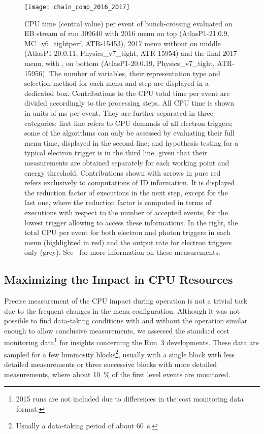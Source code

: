 \begin{figure}[ht]
\centering
\texttt{[image: chain\_comp\_2016\_2017]}%
\caption{%
\label{fig:chain_cpu_comp_2016_2017}%
\hlt CPU time (central value) per event of bunch-crossing evaluated on EB stream
of run 309640 with 2016 menu on top (AtlasP1-21.0.9, MC\_v6\_tightperf,
ATR-15453), 2017 menu without \rnn on middle (AtlasP1-20.0.11,
Physics\_v7\_tight, ATR-15954) and the final 2017 menu, with \rnn, on bottom
(AtlasP1-20.0.19, Physics\_v7\_tight, ATR-15956). The number of
variables, their representation type and selection method for each menu and step
are displayed in a dedicated box. Contributions to the CPU total time per event
are divided accordingly to the processing steps. All CPU time is shown in units
of ms per event. They are further separated in three categories: first line
refers to CPU demands of all electron triggers; some of the \fastelectron
algorithms can only be assessed by evaluating their full menu time, displayed in
the second line; and hypothesis testing for a typical electron trigger is in the
third line, given that their measurements are obtained separately for each
working point and energy threshold. Contributions shown with arrows in pure red
refers exclusively to computations of ID information. It is displayed the
reduction factor of executions in the next step, except for the last one, where
the reduction factor is computed in terms of executions with respect to the
number of accepted events, for the lowest \et{} \tight{} trigger allowing to
access these informations. In the right, the total CPU per event for both
electron and photon triggers in each menu (highlighted in red) and the \hlt
output rate for electron triggers only (grey).  See~\cite{ATR-15957} for more
information on these measurements.}
\end{figure}

\FloatBarrier
\subsection{Maximizing the Impact in CPU Resources}\label{ssec:menu_cpu}

Precise measurement of the CPU impact during operation is not a trivial
task due to the frequent changes in the menu configuration. Although it was not
possible to find data-taking conditions with and without the \rnn operation
similar enough to allow conclusive measurements, we assessed the standard cost
monitoring data\footnote{2015 runs are not included due to differences in the
cost monitoring data format.} for insights concerning the Run~3 developments.
These data are sampled for a few luminosity blocks\footnote{Usually a data-taking
period of about \SI{60}{\second}.}, usually with a single block with less
detailed measurements or three successive blocks with more detailed
measurements, where about \SI{10}{\%} of the first level events are monitored.


